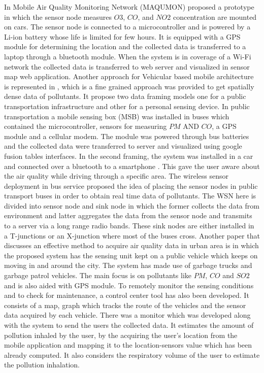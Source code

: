 In Mobile Air Quality Monitoring Network (MAQUMON) \cite{Volgyesi2008} proposed a prototype in which the sensor node  measures $O3$, $CO$, and $NO2$ concentration are mounted on cars. The sensor node is connected to a microcontroller and is powered by a Li-ion battery whose life is limited for few hours. It is equipped with a GPS module for determining the location and the collected data is transferred to a laptop through a bluetooth module. When the system is in coverage of a Wi-Fi network the collected data is transferred to web server and visualized in sensor map web application. Another approach for Vehicular based mobile architecture is represented in \cite{Devarakonda2013}, which is a fine grained approach was provided to get spatially dense data of pollutants. It propose two data framing models one for a public transportation infrastructure and other for a personal sensing device. In public transportation a mobile sensing box (MSB) was installed in buses which contained the microcontroller, sensors for measuring $PM$ AND $ CO$, a GPS module and a cellular modem. The module was powered through bus batteries and the collected data were transferred to server and visualized using google fusion tables interfaces. In the second framing, the system was installed in a car and connected over a bluetooth to a smartphone . This gave the user aware about the air quality while driving through a specific area.
The wireless sensor deployment in bus service \cite{Saha2017} proposed the idea of placing the sensor nodes in public transport buses in order to obtain real time data of pollutants. The WSN here is divided into sensor node and sink node in which the former collects the data from environment and latter aggregates the data from the sensor node and transmits to a server via a long range radio bands. These sink nodes are either installed in a T-junctions or an X-junction where most of the buses cross.
Another paper that  discusses an effective method to acquire air quality data in urban area is \cite {Shirai2016} in which the proposed system has the sensing unit kept on a public vehicle which keeps on moving in and around the city. The system has made use of garbage trucks and garbage patrol vehicles. The main focus is on pollutants like $PM$, $CO$ and $SO2$ and is also aided with GPS module. To remotely monitor the sensing conditions and to check for maintenance, a control center tool has also been developed. It consists of a map, graph which tracks the route of the vehicles and the sensor data acquired by each vehicle. There was a  monitor which was developed along with the system to send the users the collected data. It estimates the amount of pollution inhaled by the user, by the acquiring the user's location from the mobile application and mapping it to the location-sensors value which has been already computed. It also considers the respiratory volume of the user to estimate the pollution inhalation.

